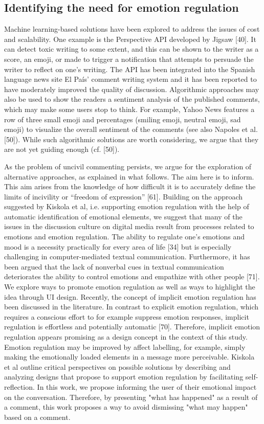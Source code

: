 \documentclass[acmtog]{acmart}
\begin{document}
\subsection{Identifying the need for emotion regulation}
Machine learning-based solutions have been explored to address the issues of cost and scalability. One example is the Perspective API developed by Jigsaw [40]. It can detect toxic writing to some extent, and this can be shown to the writer as a score, an emoji, or made to trigger a notification that attempts to persuade the writer to reflect on one’s writing. The API has been integrated into the Spanish language news site El País’ comment writing system and it has been reported to have moderately improved the quality of discussion. Algorithmic approaches may also be used to show the readers a sentiment analysis of the published comments, which may make some users stop to think. For example, Yahoo News features a row of three small emoji and percentages (smiling emoji, neutral emoji, sad emoji) to visualize the overall sentiment of the comments (see also Napoles et al. [50]). While such algorithmic solutions are worth considering, we argue that they are not yet guiding enough (cf. [50]).

 As the problem of uncivil commenting persists, we argue for the exploration of alternative approaches, as explained in what follows. The aim here is to inform. This aim arises from the knowledge of how difficult it is to accurately define the limits of incivility or “freedom of expression” [61]. Building on the approach suggested by Kiskola et al, i.e. supporting emotion regulation with the help of automatic identification of emotional elements, we suggest that many of the issues in the discussion culture on digital media result from processes related to emotions and emotion regulation. The ability to regulate one’s emotions and mood is a necessity practically for every area of life [34] but is especially challenging in computer-mediated textual communication. Furthermore, it has been argued that the lack of nonverbal cues in textual communication deteriorates the ability to control emotions and empathize with other people [71]. We explore ways to promote emotion regulation as well as ways to highlight the idea through UI design. Recently, the concept of implicit emotion regulation has been discussed in the literature. In contrast to explicit emotion regulation, which requires a conscious effort to for example suppress emotion responses, implicit regulation is effortless and potentially automatic [70]. Therefore, implicit emotion regulation appears promising as a design concept in the context of this study. Emotion regulation may be improved by affect labelling, for example, simply making the emotionally loaded elements in a message more perceivable. Kiskola et al outline critical perspectives on possible solutions by describing and analyzing designs that propose to support emotion regulation by facilitating self-reflection. In this work, we propose informing the user of their emotional impact on the conversation. Therefore, by presenting "what has happened" as a result of a comment, this work proposes a way to avoid dismissing "what may happen" based on a comment.
\end{document}
